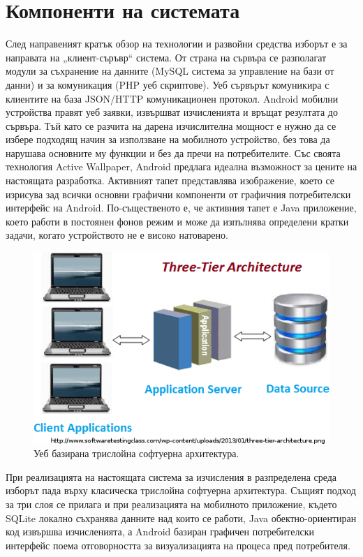 \documentclass[book,14pt,oneside,openany]{memoir}
\begin{document}
\section{Компоненти на системата}

След направеният кратък обзор на технологии и развойни средства изборът е за направата на „клиент-съръвр“ система. От страна на сървъра се разполагат модули за съхранение на данните (MySQL система за управление на бази от данни) и за комуникация (PHP уеб скриптове). Уеб сървърът комуникира с клиентите на база JSON/HTTP комуникационен протокол. Android мобилни устройства правят уеб заявки, извършват изчисленията и връщат резултата до сървъра. Тъй като се разчита на дарена изчислителна мощност е нужно да се избере подходящ начин за използване на мобилното устройство, без това да нарушава основните му функции и без да пречи на потребителите. Със своята технология Active Wallpaper, Android предлага идеална възможност за цените на настоящата разработка. Активният тапет представлява изображение, което се изрисува зад всички основни графични компоненти от графичния потребителски интерфейс на Android. По-същественото е, че активния тапет е Java приложение, което работи в постоянен фонов режим и може да изпълнява определени кратки задачи, когато устройството не е високо натоварено. 

\begin{figure}[h]
  \centering
  \includegraphics[height=0.25\pdfpageheight]{pic0008}
  \caption{Уеб базирана трислойна софтуерна архитектура.}
\label{fig:pic0008}
\end{figure}

При реализацията на настоящата система за изчисления в разпределена среда изборът пада върху класическа трислойна софтуерна архитектура. Същият подход за три слоя се прилага и при реализацията на мобилното приложение, където SQLite локално съхранява данните над които се работи, Java обектно-ориентиран код извършва изчисленията, а Android базиран графичен потребителски интерфейс поема отговорността за визуализацията на процеса пред потребителя. 
\end{document}
